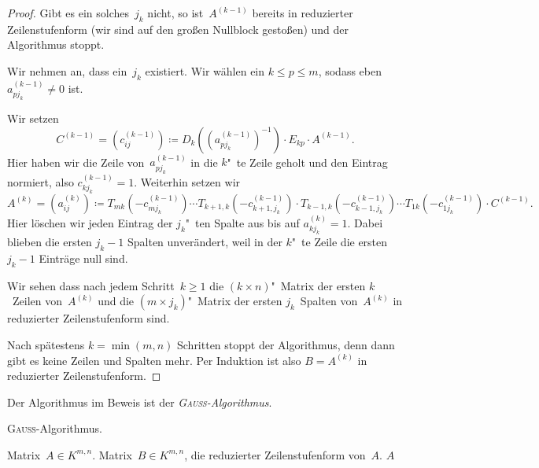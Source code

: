\documentclass[a4paper]{article}
\begin{document}
\begin{proof}
    Gibt es ein solches~$j_k$ nicht, so ist~$A^{(k-1)}$ bereits in reduzierter Zeilenstufenform (wir sind auf den großen Nullblock gestoßen) und der Algorithmus stoppt.

    Wir nehmen an, dass ein~$j_k$ existiert. Wir wählen ein $k \leq p \leq m$, sodass eben $a_{pj_k}^{(k-1)} \neq 0$ ist.

    Wir setzen
    \begin{equation*}
        C^{(k-1)} = (c_{ij}^{(k-1)}) \coloneqq D_k((a_{pj_k}^{(k-1)})^{-1}) \cdot E_{kp} \cdot A^{(k-1)}.
    \end{equation*}
    Hier haben wir die Zeile von~$a_{pj_k}^{(k-1)}$ in die $k$"~te Zeile geholt und den Eintrag normiert, also $c_{kj_k}^{(k-1)} = 1$. Weiterhin setzen wir
    \begin{equation*}
        A^{(k)} = (a_{ij}^{(k)}) \coloneqq T_{mk}(-c_{mj_k}^{(k-1)}) \cdots T_{k+1,k}(-c_{k+1,j_k}^{(k-1)}) \cdot T_{k-1,k}(-c_{k-1,j_k}^{(k-1)}) \cdots T_{1k}(-c_{1j_k}^{(k-1)}) \cdot C^{(k-1)}.
    \end{equation*}
    Hier löschen wir jeden Eintrag der $j_k$"~ten Spalte aus bis auf $a_{kj_k}^{(k)} = 1$. Dabei blieben die ersten $j_k-1$ Spalten unverändert, weil in der $k$"~te Zeile die ersten $j_k-1$ Einträge null sind.

    Wir sehen dass nach jedem Schritt~$k \geq 1$ die $(k\times n)$"~Matrix der ersten $k$~Zeilen von~$A^{(k)}$ und die $(m\times j_k)$"~Matrix der ersten $j_k$~Spalten von~$A^{(k)}$ in reduzierter Zeilenstufenform sind.

    Nach spätestens $k = \min(m,n)$ Schritten stoppt der Algorithmus, denn dann gibt es keine Zeilen und Spalten mehr. Per Induktion ist also $B = A^{(k)}$ in reduzierter Zeilenstufenform.
\end{proof}

Der Algorithmus im Beweis ist der \emph{\textsc{Gauß}-Algorithmus}.

\begin{algorithm}
    \caption{\textsc{Gauß}-Algorithmus.}
    \begin{algorithmic}[1]
        \Require Matrix~$A \in K^{m,n}$.
        \Ensure Matrix~$B \in K^{m,n}$, die reduzierter Zeilenstufenform von~$A$.
        \State{}
        \State\Return $A$
        \EndIf
    \end{algorithmic}
\end{algorithm}
\end{document}
